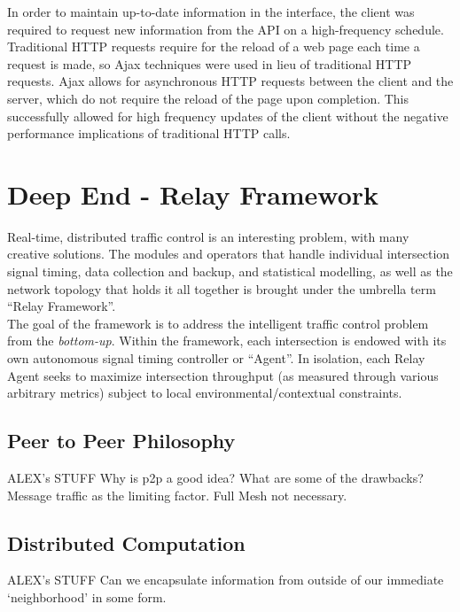\documentclass{report}
\begin{document}
In order to maintain up-to-date information in the interface, the client was required to request new information from the API on a high-frequency schedule. Traditional HTTP requests require for the reload of a web page each time a request is made, so Ajax techniques were used in lieu of traditional HTTP requests. Ajax allows for asynchronous HTTP requests between the client and the server, which do not require the reload of the page upon completion. This successfully allowed for high frequency updates of the client without the negative performance implications of traditional HTTP calls.

\section{Deep End - Relay Framework}
\label{sec:deep_end}

Real-time, distributed traffic control is an interesting problem, with many creative solutions.
The modules and operators that handle individual intersection signal timing, data collection and backup, and statistical modelling, as well as the network topology that holds it all together is brought under the umbrella term ``Relay Framework''. \\

The goal of the framework is to address the intelligent traffic control problem from the \emph{bottom-up}.
Within the framework, each intersection is endowed with its own autonomous signal timing controller or ``Agent''.
In isolation, each Relay Agent seeks to maximize intersection throughput (as measured through various arbitrary metrics) subject to local environmental/contextual constraints. \\


\subsection{Peer to Peer Philosophy}
\label{sec:p2p_philosophy}
ALEX's STUFF
Why is p2p a good idea?
What are some of the drawbacks?
Message traffic as the limiting factor.
Full Mesh not necessary.


\subsection{Distributed Computation}
\label{sec:distributed_computation}

ALEX's STUFF
Can we encapsulate information from outside of our immediate `neighborhood' in some form.
\end{document}

